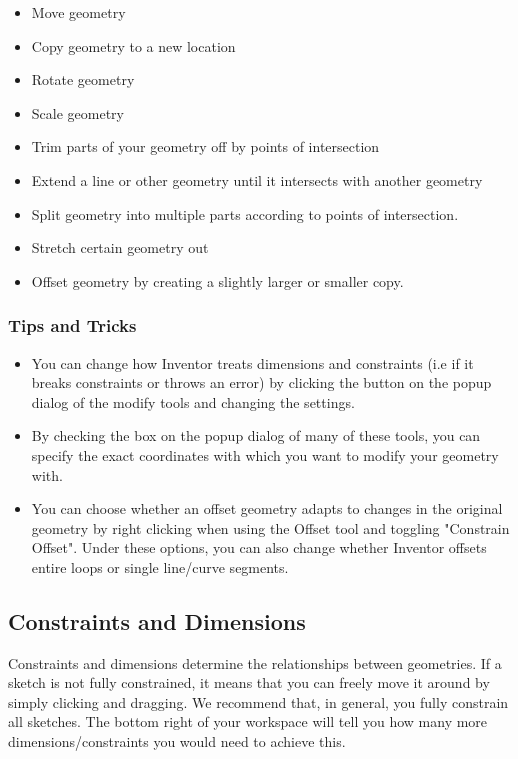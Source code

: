 \begin{itemize}
\item Move geometry
\item Copy geometry to a new location
\item Rotate geometry
\item Scale geometry
\item Trim parts of your geometry off by points of intersection
\item Extend a line or other geometry until it intersects with another geometry
\item Split geometry into multiple parts according to points of intersection.
\item Stretch certain geometry out
\item Offset geometry by creating a slightly larger or smaller copy.
\end{itemize}

\subsubsection{Tips and Tricks}
\begin{itemize}
\item You can change how Inventor treats dimensions and constraints (i.e if it breaks constraints or throws an error) by clicking the \appcommand{\textgreater \textgreater} button on the popup dialog of the modify tools and changing the settings.
\item By checking the  box on the popup dialog of many of these tools, you can specify the exact coordinates with which you want to modify your geometry with.
\item You can choose whether an offset geometry adapts to changes in the original geometry by right clicking when using the Offset tool and toggling "Constrain Offset". Under these options, you can also change whether Inventor offsets entire loops or single line/curve segments.
\end{itemize}

\subsection{Constraints and Dimensions}
Constraints and dimensions determine the relationships between geometries. If a sketch is not fully constrained, it means that you can freely move it around by simply clicking and dragging. We recommend that, in general, you fully constrain all sketches. The bottom right of your workspace will tell you how many more dimensions/constraints you would need to achieve this.

